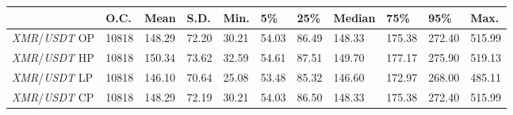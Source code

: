 \begin{tabular}{lllllllllll}
\toprule
 & \textbf{O.C.} & \textbf{Mean} & \textbf{S.D.} & \textbf{Min.} & \textbf{5\%} & \textbf{25\%} & \textbf{Median} & \textbf{75\%} & \textbf{95\%} & \textbf{Max.} \\
\midrule
\emph{XMR}/\emph{USDT} OP & 10818 & 148.29 & 72.20 & 30.21 & 54.03 & 86.49 & 148.33 & 175.38 & 272.40 & 515.99 \\
\emph{XMR}/\emph{USDT} HP & 10818 & 150.34 & 73.62 & 32.59 & 54.61 & 87.51 & 149.70 & 177.17 & 275.90 & 519.13 \\
\emph{XMR}/\emph{USDT} LP & 10818 & 146.10 & 70.64 & 25.08 & 53.48 & 85.32 & 146.60 & 172.97 & 268.00 & 485.11 \\
\emph{XMR}/\emph{USDT} CP & 10818 & 148.29 & 72.19 & 30.21 & 54.03 & 86.50 & 148.33 & 175.38 & 272.40 & 515.99 \\
\bottomrule
\end{tabular}

